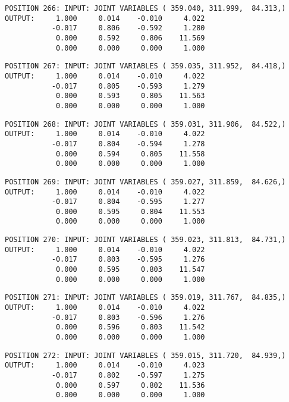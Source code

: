 \begin{verbatim}
POSITION 266: INPUT: JOINT VARIABLES ( 359.040, 311.999,  84.313,)
OUTPUT:     1.000     0.014    -0.010     4.022
           -0.017     0.806    -0.592     1.280
            0.000     0.592     0.806    11.569
            0.000     0.000     0.000     1.000
\end{verbatim} \pagebreak[1]\begin{verbatim}
POSITION 267: INPUT: JOINT VARIABLES ( 359.035, 311.952,  84.418,)
OUTPUT:     1.000     0.014    -0.010     4.022
           -0.017     0.805    -0.593     1.279
            0.000     0.593     0.805    11.563
            0.000     0.000     0.000     1.000
\end{verbatim} \pagebreak[1]\begin{verbatim}
POSITION 268: INPUT: JOINT VARIABLES ( 359.031, 311.906,  84.522,)
OUTPUT:     1.000     0.014    -0.010     4.022
           -0.017     0.804    -0.594     1.278
            0.000     0.594     0.805    11.558
            0.000     0.000     0.000     1.000
\end{verbatim} \pagebreak[1]\begin{verbatim}
POSITION 269: INPUT: JOINT VARIABLES ( 359.027, 311.859,  84.626,)
OUTPUT:     1.000     0.014    -0.010     4.022
           -0.017     0.804    -0.595     1.277
            0.000     0.595     0.804    11.553
            0.000     0.000     0.000     1.000
\end{verbatim} \pagebreak[1]\begin{verbatim}
POSITION 270: INPUT: JOINT VARIABLES ( 359.023, 311.813,  84.731,)
OUTPUT:     1.000     0.014    -0.010     4.022
           -0.017     0.803    -0.595     1.276
            0.000     0.595     0.803    11.547
            0.000     0.000     0.000     1.000
\end{verbatim} \pagebreak[1]\begin{verbatim}
POSITION 271: INPUT: JOINT VARIABLES ( 359.019, 311.767,  84.835,)
OUTPUT:     1.000     0.014    -0.010     4.022
           -0.017     0.803    -0.596     1.276
            0.000     0.596     0.803    11.542
            0.000     0.000     0.000     1.000
\end{verbatim} \pagebreak[1]\begin{verbatim}
POSITION 272: INPUT: JOINT VARIABLES ( 359.015, 311.720,  84.939,)
OUTPUT:     1.000     0.014    -0.010     4.023
           -0.017     0.802    -0.597     1.275
            0.000     0.597     0.802    11.536
            0.000     0.000     0.000     1.000
\end{verbatim} \pagebreak[1]\begin{verbatim}

\end{verbatim}
